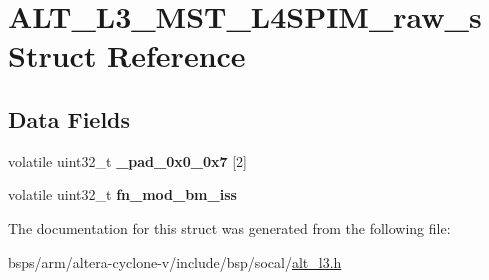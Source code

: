 \hypertarget{structALT__L3__MST__L4SPIM__raw__s}{}\section{A\+L\+T\+\_\+\+L3\+\_\+\+M\+S\+T\+\_\+\+L4\+S\+P\+I\+M\+\_\+raw\+\_\+s Struct Reference}
\label{structALT__L3__MST__L4SPIM__raw__s}
\subsection*{Data Fields}
\begin{DoxyCompactItemize}
\item 
\mbox{\label{structALT__L3__MST__L4SPIM__raw__s_a51770c39e84e7a4d8d3d82f8ae1a8372}} 
volatile uint32\+\_\+t {\bfseries \+\_\+pad\+\_\+0x0\+\_\+0x7} \mbox{[}2\mbox{]}
\item 
\mbox{\label{structALT__L3__MST__L4SPIM__raw__s_ab9fef4db29d3d368cbaff0a4bafb84df}} 
volatile uint32\+\_\+t {\bfseries fn\+\_\+mod\+\_\+bm\+\_\+iss}
\end{DoxyCompactItemize}


The documentation for this struct was generated from the following file\+:\begin{DoxyCompactItemize}
\item 
bsps/arm/altera-\/cyclone-\/v/include/bsp/socal/\mbox{\hyperlink{alt__l3_8h}{alt\+\_\+l3.\+h}}\end{DoxyCompactItemize}
